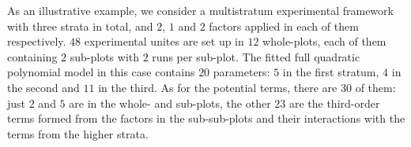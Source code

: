 
As an illustrative example, we consider a multistratum experimental framework with three strata in total, and $2$, $1$ and $2$ factors applied in each of them respectively. $48$ experimental unites are set up in $12$ whole-plots, each of them containing $2$ sub-plots with $2$ runs per sub-plot. The fitted full quadratic polynomial model in this case contains $20$ parameters: $5$ in the first stratum, $4$ in the second and $11$ in the third. As for the potential terms, there are $30$ of them: just $2$ and $5$ are  in the whole- and sub-plots, the other $23$ are the third-order terms formed from the factors in the sub-sub-plots and their interactions with the terms from the higher strata.

\begin{table}[h]
\centering
\caption{Summary of MSE(DP)-optimal split-split-plot designs}
\label{tab::mseD_ex2}
\end{table}
